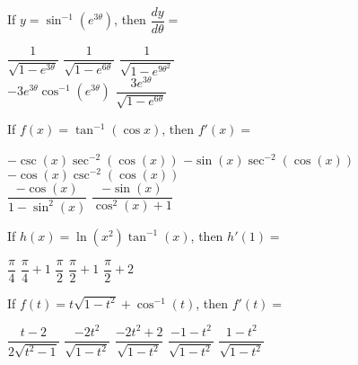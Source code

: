 \begin{questions}
    \question If $y = \sin^{-1} \left(e^{3\theta}\right)$, then $\dfrac{dy}{d\theta} = $ \\

    \begin{oneparchoices}
        \choice $\dfrac{1}{\sqrt{1 - e^{3\theta}}}$
        \choice $\dfrac{1}{\sqrt{1 - e^{6\theta}}}$
        \choice $\dfrac{1}{\sqrt{1 - e^{9\theta^2}}}$ \\[11pt]
        \makebox[0.2 \textwidth] \choice $-3e^{3\theta}\cos^{-1} \left(e^{3\theta}\right)$ 
        \makebox[0.25 \textwidth] \choice $\dfrac{3e^{3\theta}}{\sqrt{1 - e^{6\theta}}}$
    \end{oneparchoices} \par \horizontalline

    \question If $f(x) = \tan^{-1}(\cos x)$, then $f'(x) = $ \\

    \begin{oneparchoices}
        \choice $-\csc (x)\sec^{-2} (\cos (x))$
        \choice $-\sin (x)\sec^{-2} (\cos (x))$
        \choice $-\cos (x)\csc^{-2} (\cos (x))$ \\[11pt] 
        \makebox[0.23 \textwidth] \choice $\dfrac{-\cos (x)}{1 - \sin^2(x)}$
        \makebox[0.25 \textwidth] \choice $\dfrac{-\sin (x)}{\cos^2 (x) + 1}$
    \end{oneparchoices} \par \horizontalline

    \question If $h(x) = \ln \left(x^2\right)\tan^{-1} (x)$, then $h'(1) = $ \\

    \begin{oneparchoices}
        \choice $\dfrac{\pi}{4}$
        \choice $\dfrac{\pi}{4} + 1$
        \choice $\dfrac{\pi}{2}$
        \choice $\dfrac{\pi}{2} + 1$
        \choice $\dfrac{\pi}{2} + 2$
    \end{oneparchoices} \par \horizontalline

    \question If $f(t) = t\sqrt{1 - t^2} + \cos^{-1} (t)$, then $f'(t) = $ \\

    \begin{oneparchoices}
        \choice $\dfrac{t - 2}{2\sqrt{t^2 - 1}}$
        \choice $\dfrac{-2t^2}{\sqrt{1 - t^2}}$
        \choice $\dfrac{-2t^2 + 2}{\sqrt{1 - t^2}}$
        \choice $\dfrac{-1 - t^2}{\sqrt{1 - t^2}}$
        \choice $\dfrac{1 - t^2}{\sqrt{1 - t^2}}$
    \end{oneparchoices} \par \horizontalline


\end{questions}
